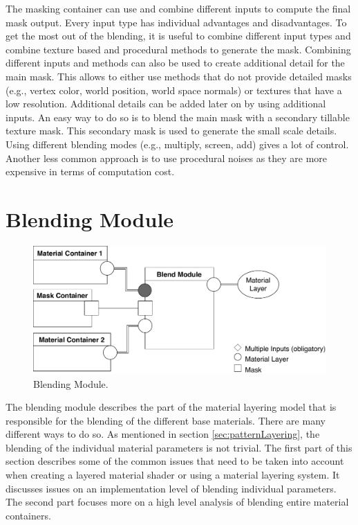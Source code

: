 	The masking container can use and combine different inputs to compute the final mask output. Every input type has individual advantages and disadvantages. To get the most out of the blending, it is useful to combine different input types and combine texture based and procedural methods to generate the mask. Combining different inputs and methods can also be used to create additional detail for the main mask. This allows to either use methods that do not provide detailed masks (e.g., vertex color, world position, world space normals) or textures that have a low resolution. Additional details can be added later on by using additional inputs. An easy way to do so is to blend the main mask with a secondary tillable texture mask. This secondary mask is used to generate the small scale details. Using different blending modes (e.g., multiply, screen, add) gives a lot of control. Another less common approach is to use procedural noises as they are more expensive in terms of computation cost.
	
\section{Blending Module}\label{sec:blendingModule}

\begin{figure}
	\centering
	\includegraphics[width=0.75\linewidth]{images/04cha_05_LayeredMaterialComponents_BlendModule.pdf}
	\caption{Blending Module.}
	\label{fig:blendModule}
\end{figure}

The blending module describes the part of the material layering model that is responsible for the blending of the different base materials. There are many different ways to do so. As mentioned in section \ref{sec:patternLayering}, the blending of the individual material parameters is not trivial. The first part of this section describes some of the common issues that need to be taken into account when creating a layered material shader or using a material layering system. It discusses issues on an implementation level of blending individual parameters. The second part focuses more on a high level analysis of blending entire material containers.    

